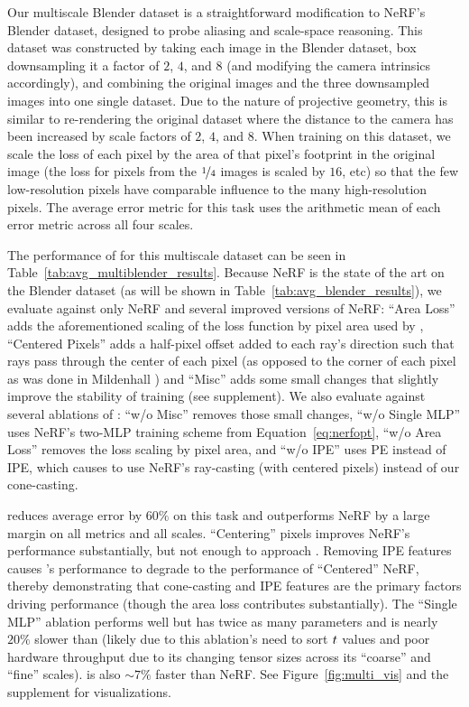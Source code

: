 \documentclass[10pt,twocolumn,letterpaper]{article}
\begin{document}
 Our multiscale Blender dataset is a straightforward modification to NeRF's Blender dataset, designed to probe aliasing and scale-space reasoning. This dataset was constructed by taking each image in the Blender dataset, box downsampling it a factor of $2$, $4$, and $8$ (and modifying the camera intrinsics accordingly), and combining the original images and the three downsampled images into one single dataset. Due to the nature of projective geometry, this is similar to re-rendering the original dataset where the distance to the camera has been increased by scale factors of $2$, $4$, and $8$. When training \shortmodelnamelower on this dataset, we scale the loss of each pixel by the area of that pixel's footprint in the original image (the loss for pixels from the $\nicefrac{1}{4}$ images is scaled by $16$, etc) so that the few low-resolution pixels have comparable influence to the many high-resolution pixels. The average error metric for this task uses the arithmetic mean of each error metric across all four scales. 

The performance of \shortmodelnamelower for this multiscale dataset can be seen in Table~\ref{tab:avg_multiblender_results}. Because NeRF is the state of the art on the Blender dataset (as will be shown in Table~\ref{tab:avg_blender_results}), we evaluate against only NeRF and several improved versions of NeRF: ``Area Loss'' adds the aforementioned scaling of the loss function by pixel area used by \shortmodelnamelower, ``Centered Pixels'' adds a  half-pixel offset added to each ray's direction such that rays pass through the center of each pixel (as opposed to the corner of each pixel as was done in Mildenhall \etal) and ``Misc'' adds some small changes that slightly improve the stability of training (see supplement).  We also evaluate against several ablations of \shortmodelnamelower: ``w/o Misc'' removes those small changes, ``w/o Single MLP'' uses NeRF's two-MLP training scheme from Equation~\ref{eq:nerfopt}, ``w/o Area Loss'' removes the loss scaling by pixel area, and ``w/o IPE'' uses PE instead of IPE, which causes \shortmodelnamelower to use NeRF's ray-casting (with centered pixels) instead of our cone-casting.

\shortmodelname reduces average error by $60\%$ on this task and outperforms NeRF by a large margin on all metrics and all scales. ``Centering'' pixels improves NeRF's performance substantially, but not enough to approach \shortmodelnamelower. Removing IPE features causes \shortmodelnamelower's performance to degrade to the performance of ``Centered'' NeRF, thereby demonstrating that cone-casting and IPE features are the primary factors driving performance (though the area loss contributes substantially). The ``Single MLP'' \shortmodelnamelower ablation performs well but has twice as many parameters and is nearly $20\%$ slower than \shortmodelnamelower (likely due to this ablation's need to sort $t$ values and poor hardware throughput due to its changing tensor sizes across its ``coarse'' and ``fine'' scales). \shortmodelname is also $\sim\!7\%$ faster than NeRF. See Figure~\ref{fig:multi_vis} and the supplement for visualizations.
\end{document}
